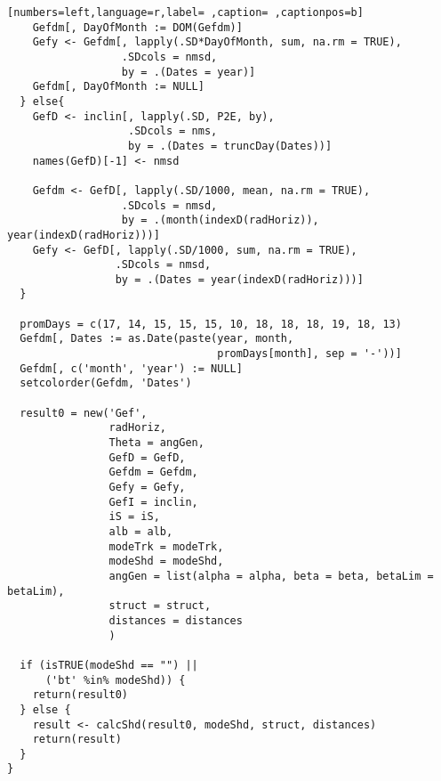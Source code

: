 \begin{lstlisting}[numbers=left,language=r,label= ,caption= ,captionpos=b]
    Gefdm[, DayOfMonth := DOM(Gefdm)]
    Gefy <- Gefdm[, lapply(.SD*DayOfMonth, sum, na.rm = TRUE),
                  .SDcols = nmsd,
                  by = .(Dates = year)]
    Gefdm[, DayOfMonth := NULL]
  } else{
    GefD <- inclin[, lapply(.SD, P2E, by),
                   .SDcols = nms,
                   by = .(Dates = truncDay(Dates))]
    names(GefD)[-1] <- nmsd

    Gefdm <- GefD[, lapply(.SD/1000, mean, na.rm = TRUE),
                  .SDcols = nmsd,
                  by = .(month(indexD(radHoriz)), year(indexD(radHoriz)))]
    Gefy <- GefD[, lapply(.SD/1000, sum, na.rm = TRUE),
                 .SDcols = nmsd,
                 by = .(Dates = year(indexD(radHoriz)))]
  }

  promDays = c(17, 14, 15, 15, 15, 10, 18, 18, 18, 19, 18, 13)
  Gefdm[, Dates := as.Date(paste(year, month,
                                 promDays[month], sep = '-'))]
  Gefdm[, c('month', 'year') := NULL]
  setcolorder(Gefdm, 'Dates')
  
  result0 = new('Gef',
                radHoriz,                           
                Theta = angGen,
                GefD = GefD,
                Gefdm = Gefdm,
                Gefy = Gefy,
                GefI = inclin,
                iS = iS,
                alb = alb,
                modeTrk = modeTrk,
                modeShd = modeShd,
                angGen = list(alpha = alpha, beta = beta, betaLim = betaLim),
                struct = struct,
                distances = distances
                )
  
  if (isTRUE(modeShd == "") ||        
      ('bt' %in% modeShd)) {            
    return(result0)
  } else {
    result <- calcShd(result0, modeShd, struct, distances)
    return(result)
  }
}
\end{lstlisting}
